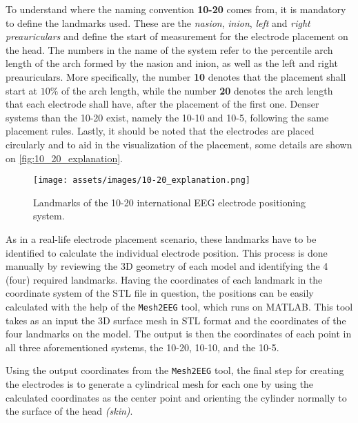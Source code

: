 To understand where the naming convention \textbf{10-20} comes from, it is mandatory to define the landmarks used. These are the \textit{\gls{nasion}}, \textit{\gls{inion}}, \textit{left} and \textit{right \gls{preauricular}s} and define the start of measurement for the electrode placement on the head. The numbers in the name of the system refer to the percentile arch length of the arch formed by the \gls{nasion} and \gls{inion}, as well as the left and right \gls{preauricular}s. More specifically, the number \textbf{10} denotes that the placement shall start at $10\%$ of the arch length, while the number \textbf{20} denotes the arch length that each electrode shall have, after the placement of the first one. Denser systems than the 10-20 exist, namely the 10-10 and 10-5, following the same placement rules. Lastly, it should be noted that the electrodes are placed circularly and to aid in the visualization of the placement, some details are shown on \autoref{fig:10_20_explanation}.

\begin{figure}[H]
    \centering
    \texttt{[image: assets/images/10-20\_explanation.png]}
    \caption[Landmarks of the 10-20 international \gls{EEG} electrode positioning system]{Landmarks of the 10-20 international \gls{EEG} electrode positioning system. \cite[figure 13.2, p.368]{Malmivuo1995}}
    \label{fig:10_20_explanation}
\end{figure}

As in a real-life electrode placement scenario, these landmarks have to be identified to calculate the individual electrode position. This process is done manually by reviewing the 3D geometry of each model and identifying the 4 (four) required landmarks. Having the coordinates of each landmark in the coordinate system of the \gls{STL} file in question, the positions can be easily calculated with the help of the \texttt{Mesh2EEG} \cite{Giacometti2014} tool, which runs on \gls{MATLAB}. This tool takes as an input the 3D surface mesh in \gls{STL} format and the coordinates of the four landmarks on the model. The output is then the coordinates of each point in all three aforementioned systems, the 10-20, 10-10, and the 10-5.

Using the output coordinates from the \texttt{Mesh2EEG} \cite{Giacometti2014} tool, the final step for creating the electrodes is to generate a cylindrical mesh for each one by using the calculated coordinates as the center point and orienting the cylinder normally to the surface of the head \textit{(skin)}.
\\\vspace{1pt}

